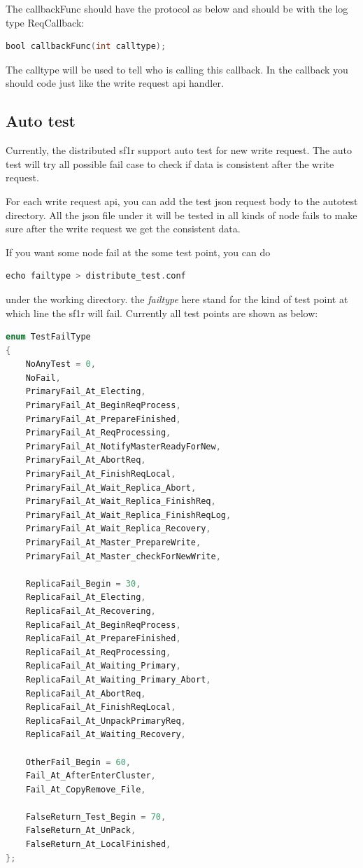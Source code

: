 The callbackFunc should have the protocol as below and should be with the log type ReqCallback:
\begin{lstlisting}[language=C]
bool callbackFunc(int calltype);
\end{lstlisting}

The calltype will be used to tell who is calling this callback. In the callback you should code just like the write request api handler.

\subsection{Auto test}
Currently, the distributed sf1r support auto test for new write request. The auto test will try all possible fail case to check if data is consistent after the write request.

For each write request api, you can add the test json request body to the autotest directory. All the json file under it will be tested in all kinds of node fails to make sure after the write request we  get the consistent data.

If you want some node fail at the some test point, you can do
\begin{lstlisting}[language=C]
echo failtype > distribute_test.conf 
\end{lstlisting}
under the working directory. the \emph{failtype}  here stand for the kind of test point at which line the sf1r will fail. Currently all test points are shown as below:
\begin{lstlisting}[language=C]
enum TestFailType
{
    NoAnyTest = 0,
    NoFail,
    PrimaryFail_At_Electing,
    PrimaryFail_At_BeginReqProcess,
    PrimaryFail_At_PrepareFinished,
    PrimaryFail_At_ReqProcessing,
    PrimaryFail_At_NotifyMasterReadyForNew,
    PrimaryFail_At_AbortReq,
    PrimaryFail_At_FinishReqLocal,
    PrimaryFail_At_Wait_Replica_Abort,
    PrimaryFail_At_Wait_Replica_FinishReq,
    PrimaryFail_At_Wait_Replica_FinishReqLog,
    PrimaryFail_At_Wait_Replica_Recovery,
    PrimaryFail_At_Master_PrepareWrite,
    PrimaryFail_At_Master_checkForNewWrite,

    ReplicaFail_Begin = 30,
    ReplicaFail_At_Electing,
    ReplicaFail_At_Recovering,
    ReplicaFail_At_BeginReqProcess,
    ReplicaFail_At_PrepareFinished,
    ReplicaFail_At_ReqProcessing,
    ReplicaFail_At_Waiting_Primary,
    ReplicaFail_At_Waiting_Primary_Abort,
    ReplicaFail_At_AbortReq,
    ReplicaFail_At_FinishReqLocal,
    ReplicaFail_At_UnpackPrimaryReq,
    ReplicaFail_At_Waiting_Recovery,

    OtherFail_Begin = 60,
    Fail_At_AfterEnterCluster,
    Fail_At_CopyRemove_File,

    FalseReturn_Test_Begin = 70,
    FalseReturn_At_UnPack,
    FalseReturn_At_LocalFinished,
};

\end{lstlisting}

